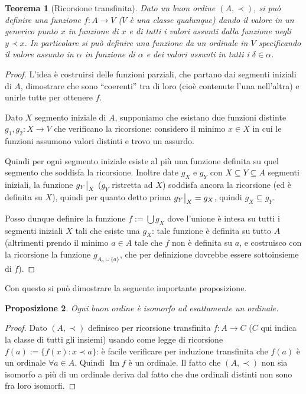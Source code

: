 \documentclass[a4paper,10pt,oneside]{article}
\newcommand\restr[2]{{%
  \left.\kern-\nulldelimiterspace %
  #1 %
  \vphantom{\big|} %
  \right|_{#2} %
  }}
\DeclareMathOperator{\im}{Im}
\theoremstyle{plain}
\newtheorem{mytheorem}{Teorema}[section]
\newtheorem{myprop}[mytheorem]{Proposizione}
\theoremstyle{definition}
\theoremstyle{remark}
\begin{document}
\begin{mytheorem}[Ricorsione transfinita]
 Dato un buon ordine $(A,\prec)$, si può definire una funzione $f:A \rightarrow V$ ($V$ è una classe qualunque) dando il valore in un generico punto $x$ in funzione di $x$ e di tutti i valori assunti dalla funzione negli $y\prec x$. In particolare si può definire una funzione da un ordinale in $V$ specificando il valore assunto in $\alpha$ in funzione di $\alpha$ e dei valori assunti in tutti i $\delta \in \alpha$.
\end{mytheorem}
\begin{proof}
 L'idea è costruirsi delle funzioni parziali, che partano dai segmenti iniziali di $A$, dimostrare che sono ``coerenti'' tra di loro (cioè contenute l'una nell'altra) e unirle tutte per ottenere $f$.
 
 Dato $X$ segmento iniziale di $A$, supponiamo che esistano due funzioni distinte $g_1 , g_2: X \rightarrow V$ che verificano la ricorsione: considero il minimo $x\in X$ in cui le funzioni assumono valori distinti e trovo un assurdo.
 
 Quindi per ogni segmento iniziale esiste al più una funzione definita su quel segmento che soddisfa la ricorsione.
 Inoltre date $g_X$ e $g_Y$ con $X\subseteq Y \subseteq A$ segmenti iniziali, la funzione $\restr{g_Y}X$ ($g_Y$ ristretta ad $X$) soddisfa ancora la ricorsione (ed è definita su $X$), quindi per quanto detto prima $\restr{g_Y}X=g_X$, quindi $g_X\subseteq g_Y$.
 
 Posso dunque definire la funzione $f:=\bigcup g_X$ dove l'unione è intesa su tutti i segmenti iniziali $X$ tali che esiste una $g_X$: tale funzione è definita su tutto $A$ (altrimenti prendo il minimo $a \in A$ tale che $f$ non è definita su $a$, e costruisco con la ricorsione la funzione $g_{A_a \cup \{a\}}$, che per definizione dovrebbe essere sottoinsieme di $f$).
\end{proof}

Con questo si può dimostrare la seguente importante proposizione.

\begin{myprop}\label{prop:isomord}
 Ogni buon ordine è isomorfo ad esattamente un ordinale.
\end{myprop}
\begin{proof}
 Dato $(A,\prec)$ definisco per ricorsione transfinita $f:A\rightarrow C$ ($C$ qui indica la classe di tutti gli insiemi) usando come legge di ricorsione $f(a):=\{f(x): x \prec a\}$: è facile verificare per induzione transfinita che $f(a)$ è un ordinale $\forall a\in A$. Quindi $\im f$ è un ordinale. Il fatto che $(A,\prec)$ non sia isomorfo a più di un ordinale deriva dal fatto che due ordinali distinti non sono fra loro isomorfi.
\end{proof}
\end{document}
